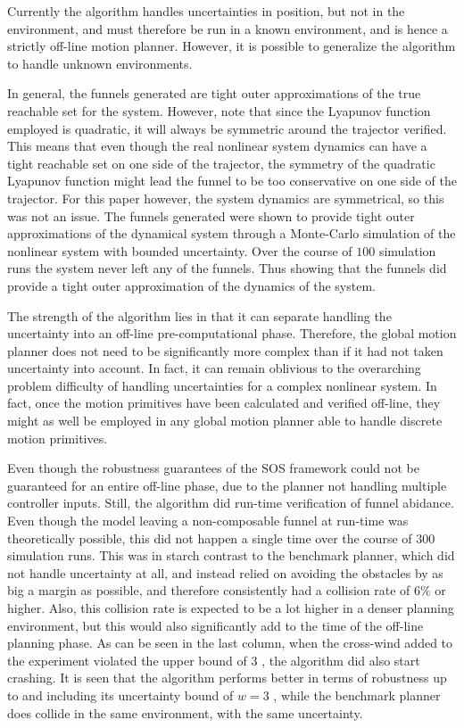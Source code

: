 
Currently the algorithm handles uncertainties in position, but not in the
environment, and must therefore be run in a known environment, and is hence a
strictly off-line motion planner. However, it is possible to generalize the
algorithm to handle unknown environments.

In general, the funnels generated are tight outer approximations of the true
reachable set for the system. However, note that since the Lyapunov function
employed is quadratic, it will always be symmetric around the trajector
verified. This means that even though the real nonlinear system dynamics can
have a tight reachable set on one side of the trajector, the symmetry of the
quadratic Lyapunov function might lead the funnel to be too conservative on one
side of the trajector. For this paper however, the system dynamics are
symmetrical, so this was not an issue. The funnels generated were shown to
provide tight outer approximations of the dynamical system through a Monte-Carlo
simulation of the nonlinear system with bounded uncertainty. Over the course of
\(100\) simulation runs the system never left any of the funnels. Thus showing
that the funnels did provide a tight outer approximation of the dynamics of the
system.


The strength of the algorithm lies in that it can separate handling the
uncertainty into an off-line pre-computational phase. Therefore, the global
motion planner does not need to be significantly more complex than if it had not
taken uncertainty into account. In fact, it can remain oblivious to the
overarching problem difficulty of handling uncertainties for a complex nonlinear
system. In fact, once the motion primitives have been calculated and verified
off-line, they might as well be employed in any global motion planner able to
handle discrete motion primitives.


Even though the robustness guarantees of the SOS framework could not be
guaranteed for an entire off-line phase, due to the planner not handling
multiple controller inputs. Still, the \rrtfunnel{} algorithm did run-time
verification of funnel abidance. Even though the model leaving a non-composable
funnel at run-time was theoretically possible, this did not happen a single time
over the course of \(300\) simulation runs. This was in starch contrast to the
benchmark planner, which did not handle uncertainty at all, and instead relied
on avoiding the obstacles by as big a margin as possible, and therefore
consistently had a collision rate of \(6\%\) or higher. Also, this collision
rate is expected to be a lot higher in a denser planning environment, but this
would also significantly add to the time of the off-line planning phase. As can
be seen in the last column, when the cross-wind added to the experiment violated
the upper bound of \(3\) , the \rrtfunnel{} algorithm did also
start crashing. It is seen that the \rrtfunnel{} algorithm performs better in
terms of robustness up to and including its uncertainty bound of \( w = 3 \)
, while the benchmark planner does collide in the same
environment, with the same uncertainty.

